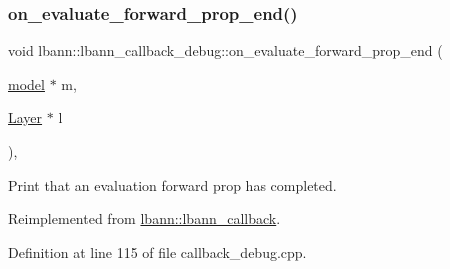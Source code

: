 \subsubsection{\texorpdfstring{on\+\_\+evaluate\+\_\+forward\+\_\+prop\+\_\+end()}{on\_evaluate\_forward\_prop\_end()}}
{\footnotesize\ttfamily void lbann\+::lbann\+\_\+callback\+\_\+debug\+::on\+\_\+evaluate\+\_\+forward\+\_\+prop\+\_\+end (\begin{DoxyParamCaption}\item[{\hyperlink{classlbann_1_1model}{model} $\ast$}]{m,  }\item[{\hyperlink{classlbann_1_1Layer}{Layer} $\ast$}]{l }\end{DoxyParamCaption})\hspace{0.3cm}{\ttfamily [override]}, {\ttfamily [virtual]}}

Print that an evaluation forward prop has completed. 

Reimplemented from \hyperlink{classlbann_1_1lbann__callback_ae23c5a61b81dbdfbd79736ac2b6035aa}{lbann\+::lbann\+\_\+callback}.



Definition at line 115 of file callback\+\_\+debug.\+cpp.


